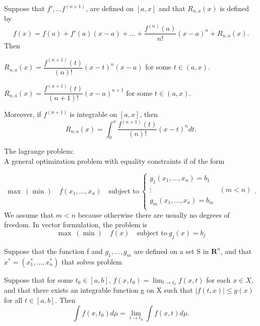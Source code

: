 \begin{theorem}
    Suppose that $f', \ldots f^{(n+1)}$, are defined on $[a,x]$ and 
    that $R_{n,a}(x)$ is defined by
    $$
        f(x) = f(a) + f'(a)(x-a) + \dots +
        \frac{f^{(n)}(a)}{n!}(x-a)^{n} + R_{n,a}(x). 
    $$
    Then
    \begin{asparaenum}[(i)]
        \item
            $R_{n,a}(x) = \dfrac{f^{(n+1)}(t)}{(n)!}(x-t)^{n}(x-a)$ for some 
            $t \in (a,x)$.
        \item
            $R_{n,a}(x) = \dfrac{f^{(n+1)}(t)}{(n+1)!}(x-a)^{n+1}$ for some 
            $t \in (a,x)$.
        \item
            Moreover, if $f^{(n+1)}$ is integrable on $[a,x]$, then
            $$
                R_{n,a}(x) = \int_{0}^{x}\dfrac{f^{(n+1)}(t)}{(n)!}(x-t)^{n} dt.
            $$
    \end{asparaenum}
\end{theorem}
The lagrange problem: \\
A general optimization problem with equality constraints if of the form

\begin{equation}
    \max \ (\min) \quad f(x_1, \ldots, x_n) \quad \text{subject to} \ %
    \left\lbrace 
        \begin{matrix}
            g_1(x_1, \ldots, x_n) = b_1 & \\
            \vdots & (m < n) \\
            g_m(x_1, \ldots, x_n) = b_m & \\
        \end{matrix}
    \right..
\end{equation}
We assume that $m<n$ because otherwise there are usually no degrees of freedom. 
In vector formulation, the problem is
$$
    \max \ (\min) \quad f(x) \quad \text{subject to} \ g_j(x) = b_j 
$$


\begin{theorem}
    Suppose that the function f and $g_1, \ldots, g_m$ are defined on a set S in 
    $\mathbf{R}^n$, and that $x^* = (x_{1}^{*}, \ldots, x_{n}^{*})$ that solves 
    problem
\end{theorem}
\begin{corollary}
    Suppose that for some $t_0 \in [a,b]$, $f(x,t_0) = \lim_{t \to t_0} f(x,t)$
    for each $x \in X$, and that there exists an integrable function g on X 
    such that $|f(t,x)| \leq g(x)$ for all $t\in[a,b]$. Then 
    $$
        \int{f(x,t_0)}d\mu = \lim_{t \to t_0} \int{f(x,t)}d\mu. 
    $$
\end{corollary}

